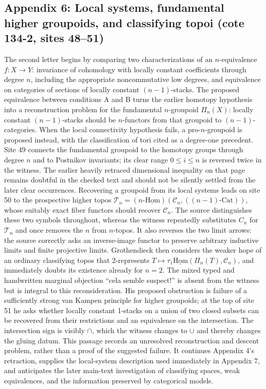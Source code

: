 \documentclass[10pt,oneside]{book}
\begin{document}
\subsection*{Appendix 6: Local systems, fundamental higher groupoids, and classifying topoi (cote 134-2, sites 48--51)}
The second letter begins by comparing two characterizations of an $n$-equivalence $f:X\to Y$: invariance of cohomology with locally constant coefficients through degree $n$, including the appropriate noncommutative low degrees, and equivalence on categories of sections of locally constant $(n-1)$-stacks. The proposed equivalence between conditions A and B turns the earlier homotopy hypothesis into a reconstruction problem for the fundamental $n$-groupoid $\Pi_n(X)$: locally constant $(n-1)$-stacks should be $n$-functors from that groupoid to $(n-1)$-categories. When the local connectivity hypothesis fails, a pro-$n$-groupoid is proposed instead, with the classification of tori cited as a degree-one precedent. Site 49 connects the fundamental groupoid to the homotopy groups through degree $n$ and to Postnikov invariants; its clear range $0\leq i\leq n$ is reversed twice in the witness. The earlier heavily retraced dimensional inequality on that page remains doubtful in the checked text and should not be silently settled from the later clear occurrences. Recovering a groupoid from its local systems leads on site 50 to the prospective higher topos $\mathcal T_n=(n\text{-}\underline{\mathrm{Hom}})(\mathcal C_n,((n-1)\text{-Cat}))$, whose suitably exact fiber functors should recover $\mathcal C_n$. The source distinguishes these two symbols throughout, whereas the witness repeatedly substitutes $C_n$ for $\mathcal T_n$ and once removes the $n$ from $n$-topos. It also reverses the two limit arrows: the source correctly asks an inverse-image functor to preserve arbitrary inductive limits and finite projective limits. Grothendieck then considers the weaker hope of an ordinary classifying topos that 2-represents $T\mapsto\tau_1\underline{\mathrm{Hom}}(\Pi_n(T),\mathcal C_n)$, and immediately doubts its existence already for $n=2$. The mixed typed and handwritten marginal objection ``cela semble suspect!'' is absent from the witness but is integral to this reconsideration. His proposed obstruction is failure of a sufficiently strong van Kampen principle for higher groupoids; at the top of site 51 he asks whether locally constant 1-stacks on a union of two closed subsets can be recovered from their restrictions and an equivalence on the intersection. The intersection sign is visibly $\cap$, which the witness changes to $\cup$ and thereby changes the gluing datum. This passage records an unresolved reconstruction and descent problem, rather than a proof of the suggested failure. It continues Appendix 4's retraction, supplies the local-system description used immediately in Appendix 7, and anticipates the later main-text investigation of classifying spaces, weak equivalences, and the information preserved by categorical models.
\end{document}
